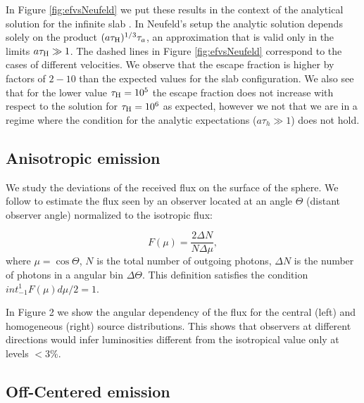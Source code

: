 \documentclass[usenatbib]{mn2e}
\begin{document}


In Figure \ref{fig:efvsNeufeld} we put these results in the context of
the analytical solution for the infinite slab \citep{Neufeld90}. In
Neufeld's setup the analytic solution depends solely on the product
$(a\tau_{\rm   H})^{1/3}\tau_{a}$, an approximation that is valid only
in the limits $a\tau_{\rm   H}\gg 1$. The dashed lines in Figure
\ref{fig:efvsNeufeld} correspond to the cases of different
velocities. We observe that the escape fraction is higher
by factors of $2-10$  than the expected values for the slab
configuration. We also see that for the lower value $\tau_{\rm
  H}=10^{5}$ the escape fraction does not increase with respect to the
solution for $\tau_{\rm H}=10^{6}$ as expected, however we not that we
are in a regime where the condition for the analytic expectations 
($a\tau_{h}\gg 1$) does not hold.



\subsection{Anisotropic emission}

We study the deviations of the received flux on the surface of the
sphere. We follow \cite{Zheng2013} to estimate the flux seen by an
observer located at an angle $\Theta$ (distant observer angle)
normalized to the isotropic flux:

\begin{equation}
F(\mu) = \frac{2\Delta N}{N\Delta \mu}, 
\end{equation}
%
where $\mu=\cos\Theta$, $N$ is the total number of outgoing photons,
$\Delta N$ is the number of photons in a angular bin $\Delta
\Theta$. This definition satisfies the condition
$int_{-1}^{1}F(\mu)d\mu/2=1$. 

In Figure 2 we show the angular dependency of the flux for the
central (left) and homogeneous (right) source distributions. This
shows that observers at different directions would infer luminosities
different from the isotropical value only at levels $< 3\%$. 


\subsection{Off-Centered emission}
\end{document}

